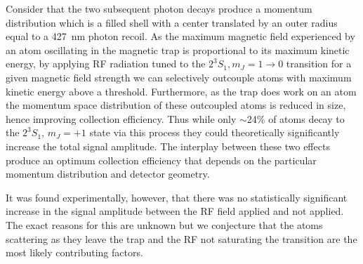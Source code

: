 \documentclass[%
 amsmath,amssymb,
aps,
]{revtex4-2}
\newcommand{\MetastableState}{2^{3\!}S_1}%
\begin{document}
Consider that the two subsequent photon decays produce a momentum distribution which is a filled shell with a center translated by an outer radius equal to a 427~nm photon recoil. As the maximum magnetic field experienced by an atom oscillating in the magnetic trap is proportional to its maximum kinetic energy, by applying RF radiation tuned to the \(\MetastableState, m_J=1 \rightarrow 0\) transition for a given magnetic field strength we can selectively outcouple atoms with maximum kinetic energy above a threshold. Furthermore, as the trap does work on an atom the momentum space distribution of these outcoupled atoms is reduced in size, hence improving collection efficiency. Thus while only $\sim$24\% of atoms decay to the \(\MetastableState,\, m_J=+1\) state via this process they could theoretically significantly increase the total signal amplitude. The interplay between these two effects produce an optimum collection efficiency that depends on the particular momentum distribution and detector geometry.

It was found experimentally, however, that there was no statistically significant increase in the signal amplitude between the RF field applied and not applied. The exact reasons for this are unknown but we conjecture that the atoms scattering as they leave the trap and the RF not saturating the transition are the most likely contributing factors.



\end{document}
